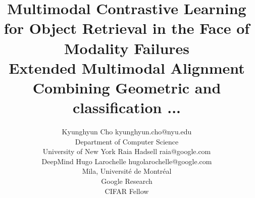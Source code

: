 \documentclass[10pt]{article} %
\title{Multimodal Contrastive Learning for Object Retrieval in the Face of Modality Failures \\ Extended Multimodal Alignment \\ Combining Geometric and classification ... }
\author{\name Kyunghyun Cho \email kyunghyun.cho@nyu.edu \\
      \addr Department of Computer Science\\
      University of New York
      \AND
      \name Raia Hadsell \email raia@google.com \\
      \addr DeepMind
      \AND
      \name Hugo Larochelle \email hugolarochelle@google.com\\
      \addr Mila, Universit\'e de Montr\'eal \\
      Google Research\\
      CIFAR Fellow}
\begin{document}
\maketitle



\begin{abstract}

    

\end{abstract}
\end{document}
